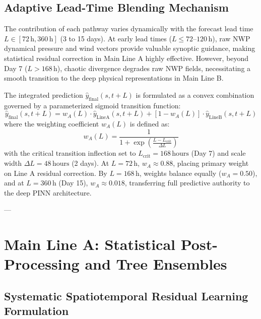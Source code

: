 \subsection{Adaptive Lead-Time Blending Mechanism}
\label{subsec:lead_time_blending}

The contribution of each pathway varies dynamically with the forecast lead time $L \in [72\,\text{h}, 360\,\text{h}]$ (3 to 15 days). At early lead times ($L \le 72\text{--}120\,\text{h}$), raw NWP dynamical pressure and wind vectors provide valuable synoptic guidance, making statistical residual correction in Main Line A highly effective. However, beyond Day 7 ($L > 168\,\text{h}$), chaotic divergence degrades raw NWP fields, necessitating a smooth transition to the deep physical representations in Main Line B.

The integrated prediction $\hat{y}_{\text{final}}(s, t+L)$ is formulated as a convex combination governed by a parameterized sigmoid transition function:
\begin{equation}
\label{eq:lead_time_blending}
\hat{y}_{\text{final}}(s, t+L) = w_A(L) \cdot \hat{y}_{\text{LineA}}(s, t+L) + \left[1 - w_A(L)\right] \cdot \hat{y}_{\text{LineB}}(s, t+L)
\end{equation}
where the weighting coefficient $w_A(L)$ is defined as:
\begin{equation}
\label{eq:sigmoid_decay}
w_A(L) = \frac{1}{1 + \exp\left(\frac{L - L_{\text{crit}}}{\Delta L}\right)}
\end{equation}
with the critical transition inflection set to $L_{\text{crit}} = 168\,\text{hours}$ (Day 7) and scale width $\Delta L = 48\,\text{hours}$ (2 days). At $L = 72\,\text{h}$, $w_A \approx 0.88$, placing primary weight on Line A residual correction. By $L = 168\,\text{h}$, weights balance equally ($w_A = 0.50$), and at $L = 360\,\text{h}$ (Day 15), $w_A \approx 0.018$, transferring full predictive authority to the deep PINN architecture.

---

\section{Main Line A: Statistical Post-Processing and Tree Ensembles}
\label{sec:main_line_a}

\subsection{Systematic Spatiotemporal Residual Learning Formulation}
\label{subsec:residual_math}

